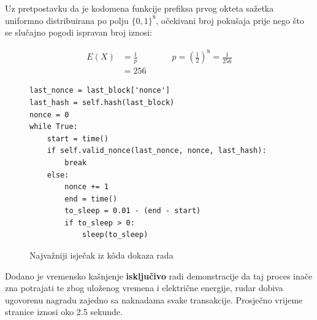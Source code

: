 \documentclass[utf8, zavrsni]{fer}
\begin{document}
Uz pretpostavku da je kodomena funkcije prefiksa prvog okteta sažetka uniformno distribuirana po polju $\{0,1\} ^{8}$, očekivani broj pokušaja prije nego što se slučajno pogodi ispravan broj iznosi:

\begin{equation} \label{eq1}
\begin{split}
E(X) &= \frac{1}{p} \qquad \qquad p = (\frac{1}{2}) ^ {8} = \frac{1}{256} \\
     &= 256
\end{split}
\end{equation}

\begin{figure}[H]
    \centering
\begin{verbatim}
last_nonce = last_block['nonce']
last_hash = self.hash(last_block)
nonce = 0
while True:
	start = time()
	if self.valid_nonce(last_nonce, nonce, last_hash):
		break
	else:
		nonce += 1
		end = time()
		to_sleep = 0.01 - (end - start)
		if to_sleep > 0:
		    sleep(to_sleep)

\end{verbatim}
    \caption{Najvažniji isječak iz kôda dokaza rada}
    \label{fig:img_pow}
\end{figure}

Dodano je vremensko kašnjenje \textbf{isključivo} radi demonstracije da taj proces inače zna potrajati te zbog uloženog vremena i električne energije, rudar dobiva ugovorenu nagradu zajedno sa naknadama svake transakcije. Prosječno vrijeme stranice iznosi oko 2.5 sekunde.
\end{document}

